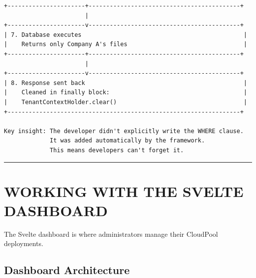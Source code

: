 \documentclass[11pt,a4paper]{report}
\begin{document}
\begin{lstlisting}[language=text]
+----------------------+-------------------------------------------+
                       |
+----------------------v-------------------------------------------+
| 7. Database executes                                              |
|    Returns only Company A's files                                 |
+----------------------+-------------------------------------------+
                       |
+----------------------v-------------------------------------------+
| 8. Response sent back                                             |
|    Cleaned in finally block:                                      |
|    TenantContextHolder.clear()                                    |
+------------------------------------------------------------------+

Key insight: The developer didn't explicitly write the WHERE clause.
             It was added automatically by the framework.
             This means developers can't forget it.
\end{lstlisting}


\vfill\hrule\vfill



\part{WORKING WITH THE SVELTE DASHBOARD}


The Svelte dashboard is where administrators manage their CloudPool deployments.


\chapter{Dashboard Architecture}
\end{document}
